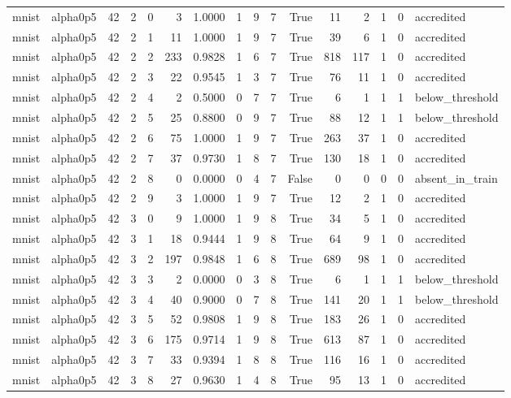 \begin{tabular}{llrrrrrrrrrrrrrl}
mnist & alpha0p5 & 42 & 2 & 0 & 3 & 1.0000 & 1 & 9 & 7 & True & 11 & 2 & 1 & 0 & accredited \\
mnist & alpha0p5 & 42 & 2 & 1 & 11 & 1.0000 & 1 & 9 & 7 & True & 39 & 6 & 1 & 0 & accredited \\
mnist & alpha0p5 & 42 & 2 & 2 & 233 & 0.9828 & 1 & 6 & 7 & True & 818 & 117 & 1 & 0 & accredited \\
mnist & alpha0p5 & 42 & 2 & 3 & 22 & 0.9545 & 1 & 3 & 7 & True & 76 & 11 & 1 & 0 & accredited \\
mnist & alpha0p5 & 42 & 2 & 4 & 2 & 0.5000 & 0 & 7 & 7 & True & 6 & 1 & 1 & 1 & below\_threshold \\
mnist & alpha0p5 & 42 & 2 & 5 & 25 & 0.8800 & 0 & 9 & 7 & True & 88 & 12 & 1 & 1 & below\_threshold \\
mnist & alpha0p5 & 42 & 2 & 6 & 75 & 1.0000 & 1 & 9 & 7 & True & 263 & 37 & 1 & 0 & accredited \\
mnist & alpha0p5 & 42 & 2 & 7 & 37 & 0.9730 & 1 & 8 & 7 & True & 130 & 18 & 1 & 0 & accredited \\
mnist & alpha0p5 & 42 & 2 & 8 & 0 & 0.0000 & 0 & 4 & 7 & False & 0 & 0 & 0 & 0 & absent\_in\_train \\
mnist & alpha0p5 & 42 & 2 & 9 & 3 & 1.0000 & 1 & 9 & 7 & True & 12 & 2 & 1 & 0 & accredited \\
mnist & alpha0p5 & 42 & 3 & 0 & 9 & 1.0000 & 1 & 9 & 8 & True & 34 & 5 & 1 & 0 & accredited \\
mnist & alpha0p5 & 42 & 3 & 1 & 18 & 0.9444 & 1 & 9 & 8 & True & 64 & 9 & 1 & 0 & accredited \\
mnist & alpha0p5 & 42 & 3 & 2 & 197 & 0.9848 & 1 & 6 & 8 & True & 689 & 98 & 1 & 0 & accredited \\
mnist & alpha0p5 & 42 & 3 & 3 & 2 & 0.0000 & 0 & 3 & 8 & True & 6 & 1 & 1 & 1 & below\_threshold \\
mnist & alpha0p5 & 42 & 3 & 4 & 40 & 0.9000 & 0 & 7 & 8 & True & 141 & 20 & 1 & 1 & below\_threshold \\
mnist & alpha0p5 & 42 & 3 & 5 & 52 & 0.9808 & 1 & 9 & 8 & True & 183 & 26 & 1 & 0 & accredited \\
mnist & alpha0p5 & 42 & 3 & 6 & 175 & 0.9714 & 1 & 9 & 8 & True & 613 & 87 & 1 & 0 & accredited \\
mnist & alpha0p5 & 42 & 3 & 7 & 33 & 0.9394 & 1 & 8 & 8 & True & 116 & 16 & 1 & 0 & accredited \\
mnist & alpha0p5 & 42 & 3 & 8 & 27 & 0.9630 & 1 & 4 & 8 & True & 95 & 13 & 1 & 0 & accredited \\

\end{tabular}
